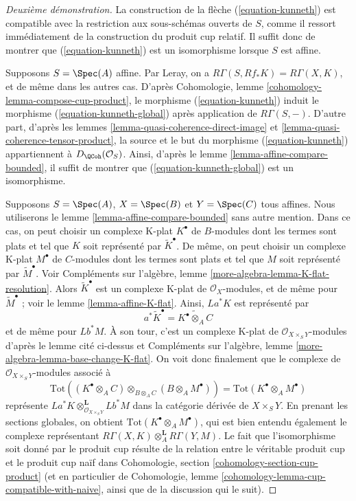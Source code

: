 \begin{proof}[Deuxième démonstration]
La construction de la flèche (\ref{equation-kunneth}) est compatible
avec la restriction aux sous-schémas ouverts de $S$, comme il ressort
immédiatement de la construction du produit cup relatif. Il suffit donc de montrer
que (\ref{equation-kunneth}) est un isomorphisme lorsque $S$ est affine.

\medskip\noindent
Supposons $S = \Spec(A)$ affine. Par Leray, on a
$R\Gamma(S, Rf_*K) = R\Gamma(X, K)$, et de même dans les autres cas.
D'après Cohomologie, lemme \ref{cohomology-lemma-compose-cup-product},
le morphisme (\ref{equation-kunneth}) induit le morphisme
(\ref{equation-kunneth-global}) après application de $R\Gamma(S, -)$.
D'autre part, d'après les lemmes \ref{lemma-quasi-coherence-direct-image} et
\ref{lemma-quasi-coherence-tensor-product},
la source et le but du morphisme
(\ref{equation-kunneth}) appartiennent à $D_\QCoh(\mathcal{O}_S)$.
Ainsi, d'après le lemme \ref{lemma-affine-compare-bounded}, il suffit de montrer que
(\ref{equation-kunneth-global}) est un isomorphisme.

\medskip\noindent
Supposons $S = \Spec(A)$, $X = \Spec(B)$ et $Y = \Spec(C)$ tous affines.
Nous utiliserons le lemme \ref{lemma-affine-compare-bounded} sans autre mention.
Dans ce cas, on peut choisir un complexe K-plat $K^\bullet$ de $B$-modules
dont les termes sont plats et tel que $K$ soit représenté par $\widetilde{K}^\bullet$.
De même, on peut choisir un complexe K-plat $M^\bullet$ de $C$-modules
dont les termes sont plats et tel que $M$ soit représenté par $\widetilde{M}^\bullet$.
Voir Compléments sur l'algèbre, lemme \ref{more-algebra-lemma-K-flat-resolution}.
Alors $\widetilde{K}^\bullet$ est un complexe K-plat de $\mathcal{O}_X$-modules,
et de même pour $\widetilde{M}^\bullet$ ; voir
le lemme \ref{lemma-affine-K-flat}. Ainsi,
$La^*K$ est représenté par
$$
a^*\widetilde{K}^\bullet = \widetilde{K^\bullet \otimes_A C}
$$
et de même pour $Lb^*M$. À son tour, c'est un complexe K-plat
de $\mathcal{O}_{X \times_S Y}$-modules d'après le lemme cité ci-dessus
et Compléments sur l'algèbre, lemme \ref{more-algebra-lemma-base-change-K-flat}.
On voit donc finalement que le complexe de
$\mathcal{O}_{X \times_S Y}$-modules associé à
$$
\text{Tot}((K^\bullet \otimes_A C) \otimes_{B \otimes_A C}
(B \otimes_A M^\bullet)) =
\text{Tot}(K^\bullet \otimes_A M^\bullet)
$$
représente $La^*K \otimes_{\mathcal{O}_{X \times_S Y}}^\mathbf{L} Lb^*M$
dans la catégorie dérivée de $X \times_S Y$. En prenant les sections globales,
on obtient $\text{Tot}(K^\bullet \otimes_A M^\bullet)$, qui est bien entendu
également le complexe représentant
$R\Gamma(X, K) \otimes_A^\mathbf{L} R\Gamma(Y, M)$.
Le fait que l'isomorphisme soit donné par le produit cup résulte de la
relation entre le véritable produit cup et le produit cup naïf
dans Cohomologie, section \ref{cohomology-section-cup-product}
(et en particulier de
Cohomologie, lemme \ref{cohomology-lemma-cup-compatible-with-naive},
ainsi que de la discussion qui le suit).


\end{proof}
